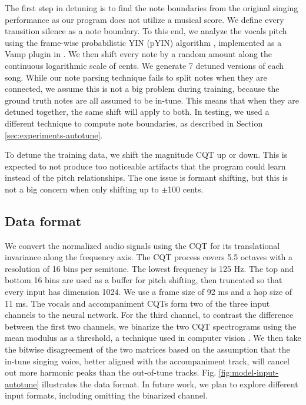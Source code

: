 The first step in detuning is to find the note boundaries from the original singing performance as our program does not utilize a musical score. We define every transition silence as a note boundary. To this end, we analyze the vocals pitch using the frame-wise probabilistic YIN (pYIN) algorithm \cite{mauch2014pyin}, implemented as a Vamp plugin in \cite{cannam2010sonic}. We then shift every note by a random amount along the continuous logarithmic scale of cents. We generate 7 detuned versions of each song. While our note parsing technique fails to split notes when they are connected, we assume this is not a big problem during training, because the ground truth notes are all assumed to be in-tune. This means that when they are detuned together, the same shift will apply to both. In testing, we used a different technique to compute note boundaries, as described in Section \ref{sec:experiments-autotune}.

To detune the training data, we shift the magnitude CQT up or down. This is expected to not produce too noticeable artifacts that the program could learn instead of the pitch relationships. The one issue is formant shifting, but this is not a big concern when only shifting up to $\pm$100 cents. 

\subsection{Data format}
\label{sec:data-format-autotune}
We convert the normalized audio signals using the CQT for its translational invariance along the frequency axis. The CQT process covers 5.5 octaves with a resolution of 16 bins per semitone. The lowest frequency is 125 Hz. The top and bottom 16 bins are used as a buffer for pitch shifting, then truncated so that every input has dimension 1024. We use a frame size of 92 ms and a hop size of 11 ms. The vocals and accompaniment CQTs form two of the three input channels to the neural network. For the third channel, to contrast the difference between the first two channels, we binarize the two CQT spectrograms using the mean modulus as a threshold, a technique used in computer vision \cite{sezgin2004survey}. We then take the bitwise disagreement of the two matrices based on the assumption that the in-tune singing voice, better aligned with the accompaniment track, will cancel out more harmonic peaks than the out-of-tune tracks. Fig. \ref{fig:model-input-autotune} illustrates the data format. In future work, we plan to explore different input formats, including omitting the binarized channel.

